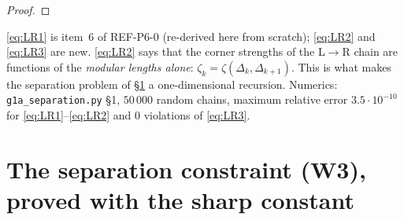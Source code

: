 \documentclass[11pt]{article}
\theoremstyle{definition}\newtheorem{example}[theorem]{Example}
\begin{document}
\begin{proof}
\end{proof}

\begin{verdictok}
\eqref{eq:LR1} is item~6 of REF-P6-0 (re-derived here from scratch); \eqref{eq:LR2} and
\eqref{eq:LR3} are new.  \eqref{eq:LR2} says that the corner strengths of the L$\to$R chain are
functions of the \emph{modular lengths alone}: $\zeta_k=\zeta(\Delta_k,\Delta_{k+1})$.  This is
what makes the separation problem of \S\ref{sec:sep} a one-dimensional recursion.  Numerics:
\texttt{g1a\_separation.py} \S1, $50\,000$ random chains, maximum relative error
$3.5\cdot10^{-10}$ for \eqref{eq:LR1}--\eqref{eq:LR2} and $0$ violations of \eqref{eq:LR3}.
\end{verdictok}

\section{The separation constraint (W3), proved with the sharp constant}\label{sec:sep}
\end{document}
